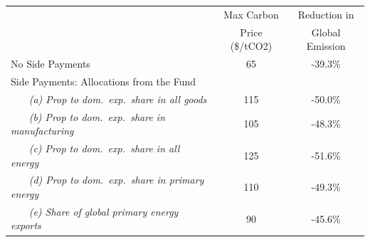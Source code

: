 \begin{center}
\small
\setlength{\tabcolsep}{4pt}
\renewcommand{\arraystretch}{1.25}
\begin{tabular}{l cc}
\hline
 & Max Carbon & Reduction in \\
 & Price (\$/tCO2) & Global Emission \\
\hline
 No Side Payments & 65 & -39.3\% \\
\multicolumn{3}{l}{Side Payments: Allocations from the Fund} \\
 ~~~ \textit{(a) Prop to dom.\ exp.\ share in all goods} & 115 & -50.0\% \\
 ~~~ \textit{(b) Prop to dom.\ exp.\ share in manufacturing} & 105 & -48.3\% \\
 ~~~ \textit{(c) Prop to dom.\ exp.\ share in all energy} & 125 & -51.6\% \\
 ~~~ \textit{(d) Prop to dom.\ exp.\ share in primary energy} & 110 & -49.3\% \\
 ~~~ \textit{(e) Share of global primary energy exports} & 90 & -45.6\% \\
\hline
\end{tabular}
\end{center}
